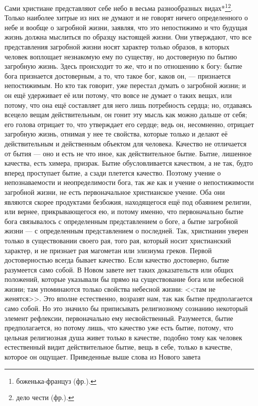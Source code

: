 \documentclass[12pt,oneside]{book}
\begin{document}
Сами христиане представляют себе небо в весьма разнообразных видах*\let\svthefootnote\thefootnote\let\thefootnote\relax{}\let\thefootnote\svthefootnote\footnote{боженька-француз (фр.).}\footnote{дело чести (фр.).}. Только наиболее хитрые из них не думают и не говорят ничего определенного о небе и вообще о загробной жизни, заявляя, что это непостижимо и что будущая жизнь должна мыслиться по образцу настоящей жизни. Они утверждают, что все представления загробной жизни носят характер только образов, в которых человек воплощает незнакомую ему по существу, но достоверную по бытию загробную жизнь. Здесь происходит то же, что и по отношению к богу: бытие бога признается достоверным, а то, что такое бог, каков он, --- признается непостижимым. Но кто так говорит, уже перестал думать о загробной жизни; и он ещё удерживает её или потому, что вовсе не думает о таких вещах, или потому, что она ещё составляет для него лишь потребность сердца; но, отдаваясь всецело вещам действительным, он гонит эту мысль как можно дальше от себя; его голова отрицает то, что утверждает его сердце; ведь он, несомненно, отрицает загробную жизнь, отнимая у нее те свойства, которые только и делают её действительным и действенным объектом для человека. Качество не отличается от бытия --- оно и есть не что иное, как действительное бытие. Бытие, лишенное качества, есть химера, призрак. Бытие обусловливается качеством, а не так, будто вперед проступает бытие, а сзади плетется качество. Поэтому учение о непознаваемости и неопределимости бога, так же как и учение о непостижимости загробной жизни, не есть первоначальное христианское учение. Оба они являются скорее продуктами безбожия, находящегося ещё под обаянием религии, или вернее, прикрывающегося ею, и потому именно, что первоначально бытие бога связывалось с определенным представлением о боге, а бытие загробной жизни --- с определенным представлением о последней. Так, христианин уверен только в существовании своего рая, того рая, который носит христианский характер, и не признает рая магометан или элизиума греков. Первой достоверностью всегда бывает качество. Если качество достоверно, бытие разумеется само собой. В Новом завете нет таких доказательств или общих положений, которые указывали бы прямо на существование бога или небесной жизни; там упоминаются только свойства небесной жизни: <<там не женятся>>. Это вполне естественно, возразят нам, так как бытие предполагается само собой. Но это значило бы приписывать религиозному сознанию некоторый элемент рефлексии, первоначально ему несвойственный. Разумеется, бытие предполагается, но потому лишь, что качество уже есть бытие, потому, что цельная религиозная душа живет только в качестве, подобно тому как человек естественный видит действительное бытие, вещь в себе, только в качестве, которое он ощущает. Приведенные выше слова из Нового завета 
\end{document}
